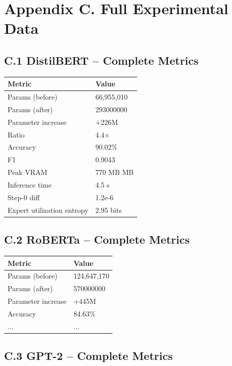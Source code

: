 \section{Appendix C. Full Experimental Data}

\subsection{C.1 DistilBERT -- Complete Metrics}

\begin{table}[H]
\centering
\small
\begin{tabular}{ll}
\toprule
\textbf{Metric} & \textbf{Value} \\
\midrule
Params (before) & 66,955,010 \\
Params (after) & 293000000 \\
Parameter increase & +226M \\
Ratio & 4.4$\times$ \\
Accuracy & 90.02\% \\
F1 & 0.9043 \\
Peak VRAM & 770 MB MB \\
Inference time & 4.5 s \\
Step-0 diff & 1.2e-6 \\
Expert utilization entropy & 2.95 bits \\
\bottomrule
\end{tabular}
\end{table}

\subsection{C.2 RoBERTa -- Complete Metrics}

\begin{table}[H]
\centering
\small
\begin{tabular}{ll}
\toprule
\textbf{Metric} & \textbf{Value} \\
\midrule
Params (before) & 124,647,170 \\
Params (after) & 570000000 \\
Parameter increase & +445M \\
Accuracy & 84.63\% \\
... & ... \\
\bottomrule
\end{tabular}
\end{table}

\subsection{C.3 GPT-2 -- Complete Metrics}

